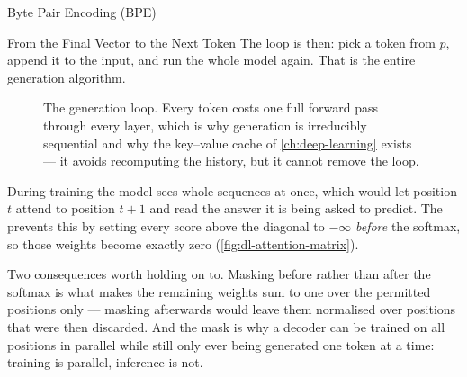 \begin{v3topic}{Byte Pair Encoding (BPE)}
\begin{v3topic}{From the Final Vector to the Next Token}
The loop is then: pick a token from $p$, append it to the input, and run the
whole model again. That is the entire generation algorithm.

\begin{figure}[htbp]
\centering
{}
\caption{The generation loop. Every token costs one full forward pass through
every layer, which is why generation is irreducibly sequential and why the
key--value cache of \cref{ch:deep-learning} exists --- it avoids recomputing the
history, but it cannot remove the loop.}
\label{fig:nlp-generation-loop}
\end{figure}

\begin{cautionbox}
During training the model sees whole sequences at once, which would let
position $t$ attend to position $t+1$ and read the answer it is being asked to
predict. The  prevents this by setting every score above
the diagonal to $-\infty$ \emph{before} the softmax, so those weights become
exactly zero (\cref{fig:dl-attention-matrix}).

Two consequences worth holding on to. Masking before rather than after the
softmax is what makes the remaining weights sum to one over the permitted
positions only --- masking afterwards would leave them normalised over
positions that were then discarded. And the mask is why a decoder can be
trained on all positions in parallel while still only ever being generated one
token at a time: training is parallel, inference is not.
\end{cautionbox}
\end{v3topic}


\end{v3topic}
